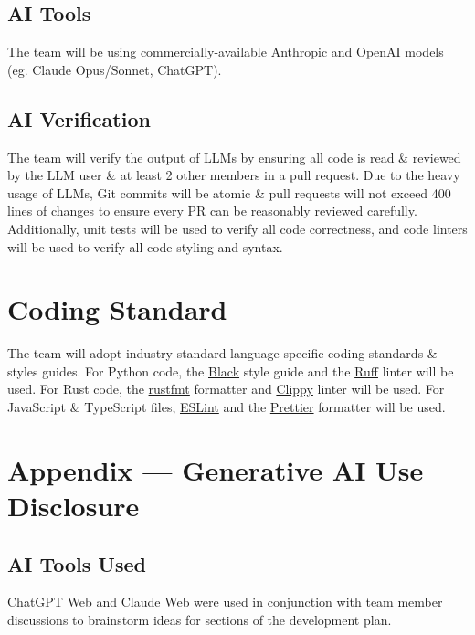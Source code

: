\documentclass{article}
\begin{document}
\subsection{AI Tools}
The team will be using commercially-available Anthropic and OpenAI models (eg. Claude
Opus/Sonnet, ChatGPT).

\subsection{AI Verification}
The team will verify the output of LLMs by ensuring all code is read \& reviewed by the
LLM user \& at least 2 other members in a pull request. Due to the heavy usage of LLMs, Git commits
will be atomic \& pull requests will not exceed 400 lines of changes to ensure every PR can be reasonably
reviewed carefully. Additionally, unit tests will be used to verify all code correctness, and code linters 
will be used to verify all code styling and syntax.

\section{Coding Standard}

The team will adopt industry-standard language-specific coding standards \& styles guides.
For Python code, the \href{https://black.readthedocs.io/en/stable/the_black_code_style/current_style.html}{Black}
style guide and the \href{https://docs.astral.sh/ruff/linter/}{Ruff} linter will be used. For Rust code, the
\href{https://rust-lang.github.io/rustfmt/?version=v1.10.0&search=}{rustfmt} formatter and
\href{https://doc.rust-lang.org/clippy/lints.html}{Clippy} linter will be used. For JavaScript \& TypeScript files,
\href{https://eslint.org/}{ESLint} and the \href{https://prettier.io/}{Prettier} formatter will be used.

\newpage{}

\section{Appendix --- Generative AI Use Disclosure}

\subsection{AI Tools Used}

ChatGPT Web and Claude Web were used in conjunction with team member discussions to brainstorm ideas for sections of the development plan.
\end{document}
